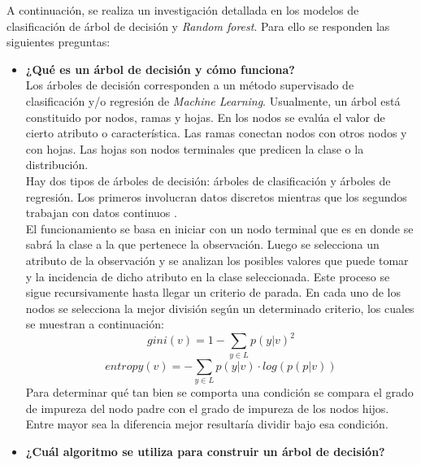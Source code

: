 A continuación, se realiza un investigación detallada en los modelos de clasificación de árbol de decisión y \textit{Random forest}. Para ello se responden las siguientes preguntas:
\begin{itemize}
    \item \textbf{¿Qué es un árbol de decisión y cómo funciona?}\\
    
    Los árboles de decisión corresponden a un método supervisado de clasificación y/o regresión de \textit{Machine Learning}. Usualmente, un árbol está constituido por nodos, ramas y hojas. En los nodos se evalúa el valor de cierto atributo o característica. Las ramas conectan nodos con otros nodos y con hojas. Las hojas son nodos terminales que predicen la clase o la distribución.\\
    Hay dos tipos de árboles de decisión: árboles de clasificación y árboles de regresión. Los primeros involucran datos discretos mientras que los segundos trabajan con datos continuos \cite{Sklearn-DT}. \\
    El funcionamiento se basa en iniciar con un nodo terminal que es en donde se sabrá la clase a la que pertenece la observación. Luego se selecciona un atributo de la observación y se analizan los posibles valores que puede tomar y la incidencia de dicho atributo en la clase seleccionada. Este proceso se sigue recursivamente hasta llegar un criterio de parada. En cada uno de los nodos se selecciona la mejor división según un determinado criterio, los cuales se muestran a continuación:
    \begin{equation}
        gini(v) = 1-\sum_{y \in L} p(y|v)^2
    \end{equation}
    \begin{equation}
        entropy(v) = -\sum_{y \in L} p(y|v) \cdot log(p(p|v))
    \end{equation}
    Para determinar qué tan bien se comporta una condición se compara el grado de impureza del nodo padre con el grado de impureza de los nodos hijos. Entre mayor sea la diferencia mejor resultaría dividir bajo esa condición.  
    
    \item \textbf{¿Cuál algoritmo se utiliza para construir un árbol de decisión?}\\
    

\end{itemize}
